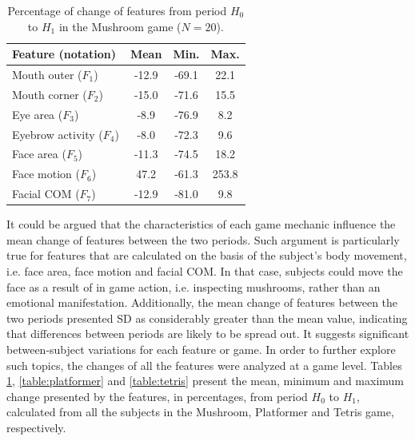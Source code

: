 \begin{table}
    \caption{Percentage of change of features from period $H_0$ to $H_1$ in the Mushroom game ($N=20$).}
    \label{table:mushroom}
    \centering
    \begin{threeparttable}
        \begin{tabular}{lccc}
            \toprule%
                \textbf{Feature (notation)} & \textbf{Mean} & \textbf{Min.} & \textbf{Max.} \\
            \midrule%
                Mouth outer ($F_1$)      & -12.9 & -69.1  &  22.1  \\
                Mouth corner ($F_2$)     & -15.0 & -71.6  &  15.5  \\
                Eye area ($F_3$)         & -8.9  & -76.9  &  8.2   \\
                Eyebrow activity ($F_4$) & -8.0  & -72.3  &  9.6   \\
                Face area ($F_5$)        & -11.3 & -74.5  &  18.2  \\
                Face motion ($F_6$)      & 47.2  & -61.3  &  253.8 \\
                Facial COM ($F_7$)       & -12.9 & -81.0  &  9.8   \\
            \bottomrule%
        \end{tabular}
        \begin{tablenotes}
          \small
          \item[]{}
        \end{tablenotes}
    \end{threeparttable}
\end{table}

It could be argued that the characteristics of each game mechanic influence the mean change of features between the two periods. Such argument is particularly true for features that are calculated on the basis of the  subject's body movement, i.e. face area, face motion and facial COM. In that case, subjects could move the face as a result of in game action, i.e. inspecting mushrooms, rather than an emotional manifestation. Additionally, the mean change of features between the two periods presented SD as considerably greater than the mean value, indicating that differences between periods are likely to be spread out. It suggests significant between-subject variations for each feature or game. In order to further explore such topics, the changes of all the features were analyzed at a game level. Tables \ref{table:mushroom}, \ref{table:platformer} and \ref{table:tetris} present the mean, minimum and maximum change presented by the features, in percentages, from period $H_0$ to $H_1$, calculated from all the subjects in the Mushroom, Platformer and Tetris game, respectively.

